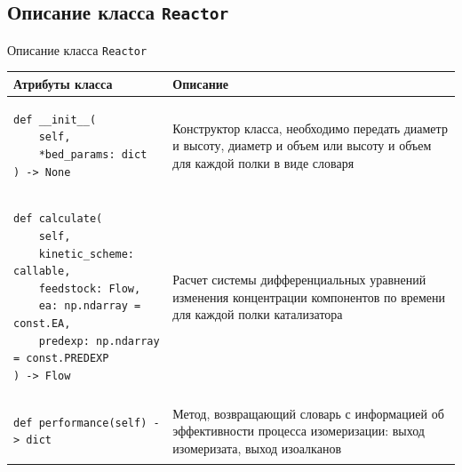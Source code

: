 \documentclass[aspectratio=169, mathserif]{beamer}%
\begin{document}
\subsection{Описание класса \texttt{Reactor}}
\begin{frame}[fragile, label=c]{Описание класса \texttt{Reactor}}
\scriptsize
\begin{table}[h!]
\centering
\renewcommand{\arraystretch}{1.2}
\begin{tabular}{|p{.49\linewidth}|p{.49\linewidth}|}
	\hline
	\textbf{Атрибуты класса} & \textbf{Описание}  \\
	\hline
\begin{minipage}{\linewidth}
\vfill
\begin{verbatim}
def __init__(
    self,
    *bed_params: dict
) -> None
\end{verbatim}
\vfill
\end{minipage}
	&
\begin{minipage}{\linewidth}
Конструктор класса, необходимо передать диаметр и высоту, диаметр и объем или высоту и объем для каждой полки в виде словаря
\end{minipage}
	\\
	\hline
\begin{minipage}{\linewidth}
\vfill
\begin{verbatim}
def calculate(
    self,
    kinetic_scheme: callable,
    feedstock: Flow,
    ea: np.ndarray = const.EA,
    predexp: np.ndarray = const.PREDEXP
) -> Flow
\end{verbatim}
\vfill
\end{minipage}
		&
\begin{minipage}{\linewidth}
Расчет системы дифференциальных уравнений изменения концентрации компонентов по времени для каждой полки катализатора
\end{minipage}
		\\
		\hline
\begin{minipage}{\linewidth}
\vfill
\begin{verbatim}
def performance(self) -> dict
\end{verbatim}
\vfill
\end{minipage}
		& Метод, возвращающий словарь с информацией об эффективности процесса изомеризации: выход изомеризата, выход изоалканов \\
		\hline
	\end{tabular}
\end{table}
\vfill
\end{frame}
\end{document}

